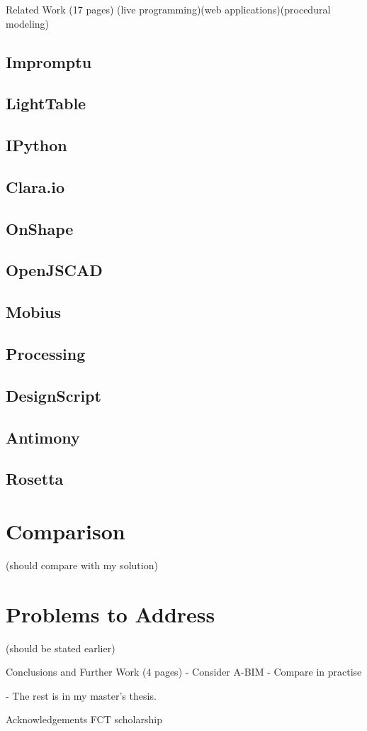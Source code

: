 Related Work (17 pages)
(live programming)(web applications)(procedural modeling)
\subsection{Impromptu}
\subsection{LightTable}
\subsection{IPython}
\subsection{Clara.io}
\subsection{OnShape}
\subsection{OpenJSCAD}
\subsection{Mobius}
\subsection{Processing}
\subsection{DesignScript}
\subsection{Antimony}
\subsection{Rosetta}
\section{Comparison} (should compare with my solution)
\section{Problems to Address} (should be stated earlier)


Conclusions and Further Work (4 pages)
 - Consider A-BIM
 - Compare in practise


- The rest is in my master's thesis.

Acknowledgements
FCT scholarship
